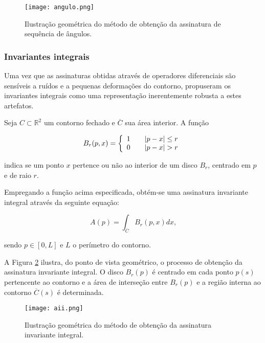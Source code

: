 \begin{figure}[h!]
  \caption{\label{fig:angulo} Ilustração geométrica do método de obtenção da assinatura de sequência de ângulos.}
  \centering
  \texttt{[image: angulo.png]}
\end{figure}

\subsubsection*{Invariantes integrais}

Uma vez que as assinaturas obtidas através de operadores diferenciais são sensíveis a ruídos e a pequenas deformações do contorno,  propuseram os invariantes integrais como uma representação inerentemente robusta a estes artefatos.

Seja $C \subset \mathbb{R}^2$ um contorno fechado e $\overline{C}$ sua área interior.
A função 

\begin{equation}
 B_r(p,x) = \left\{
  \begin{array}{l l}
    1 & \quad |p-x|\leq r\\
    0 & \quad |p-x|> r
  \end{array} \right.
\end{equation} 

\noindent
indica se um ponto $x$ pertence ou não ao interior de um disco $B_r$,  centrado em $p$ e de raio $r$.

Empregando a função acima especificada, obtém-se uma assinatura invariante integral através da seguinte equação: 

\begin{equation}
A(p) = \int_{\overline{C}}{B_r(p,x)dx}\text{,}
\end{equation} 

\noindent
sendo $p \in [0,L]$ e $L$ o perímetro do contorno.

A Figura \ref{fig:Aii} ilustra, do ponto de vista geométrico, o processo de obtenção da assinatura invariante integral. O disco $B_r(p)$ é centrado em cada ponto $p(s)$ pertencente ao contorno e a área de interseção entre $B_r(p)$ e a região interna ao contorno $\overline{C}(s)$ é determinada.

\begin{figure}[h!]
  \caption{\label{fig:Aii} Ilustração geométrica do método de obtenção da assinatura invariante integral.}
  \centering
  \texttt{[image: aii.png]}
\end{figure}

